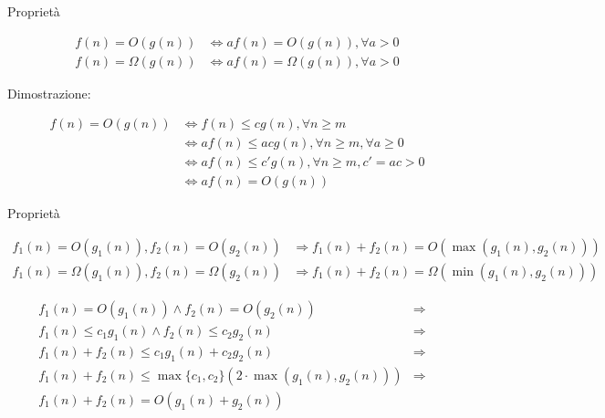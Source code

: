 \begin{frame}{Proprietà}

\begin{myboxtitle}
\begin{align*}
  f(n) = O(g(n)) &\Leftrightarrow af(n) = O(g(n)), \forall a>0 \\
  f(n) = \Omega(g(n)) &\Leftrightarrow af(n) = \Omega(g(n)), \forall a>0 
\end{align*}
\end{myboxtitle}

Dimostrazione:

\begin{align*}
  f(n) = O(g(n)) &\Leftrightarrow f(n) \leq cg(n), \forall n \geq m \\
                 &\Leftrightarrow af(n) \leq acg(n), \forall n \geq m, \forall a \geq 0 \\
                 &\Leftrightarrow af(n) \leq c'g(n), \forall n \geq m, c' = ac > 0 \\
                 &\Leftrightarrow af(n) = O(g(n))
\end{align*}

\end{frame}

\begin{frame}{Proprietà}

\begin{myboxtitle}
\small
\begin{align*}
  f_1(n) = O(g_1(n)), f_2(n) = O(g_2(n)) &\Rightarrow f_1(n)+f_2(n) = O(\max(g_1(n), g_2(n))) \\
  f_1(n) = \Omega(g_1(n)), f_2(n) = \Omega(g_2(n)) &\Rightarrow f_1(n)+f_2(n) = \Omega(\min(g_1(n), g_2(n))) 
\end{align*}
\end{myboxtitle}

\begin{myboxtitle}[Dimostrazione]
\begin{eqnarray*}
  f_1(n) = O(g_1(n)) \wedge f_2(n) = O(g_2(n)) &\Rightarrow& \\
    f_1(n) \leq c_1g_1(n) \wedge f_2(n) \leq c_2g_2(n) &\Rightarrow& \\
    f_1(n)+f_2(n) \leq c_1g_1(n) + c_2g_2(n) &\Rightarrow& \\
    f_1(n)+f_2(n) \leq \max\{c_1,c_2\} (2 \cdot \max(g_1(n),g_2(n))) &\Rightarrow& \\
    f_1(n)+f_2(n) = O(g_1(n)+g_2(n))
\end{eqnarray*}
\end{myboxtitle}

\end{frame}

